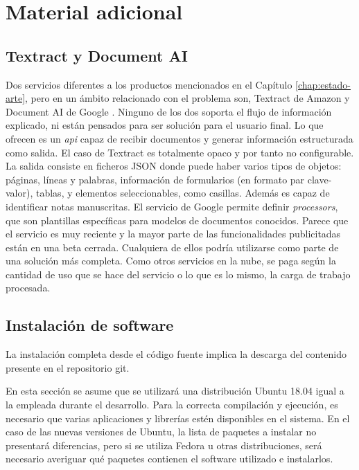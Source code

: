 
\chapter{Material adicional}
\label{chap:material-adicional}

\section{Textract y Document AI}
\label{sec:textract-y-document-ai}

Dos servicios diferentes a los productos mencionados en el Capítulo \ref{chap:estado-arte}, pero en un ámbito relacionado con el problema son, Textract de Amazon \cite{solucionesComerciales_amazon_textract} y Document AI de Google \cite{solucionesComerciales_google_documentAI}. Ninguno de los dos soporta el flujo de información explicado, ni están pensados para ser solución para el usuario final. Lo que ofrecen es un \emph{\acrshort{api}} capaz de recibir documentos y generar información estructurada como salida. El caso de Textract es totalmente opaco y por tanto no configurable. La salida consiste en ficheros JSON donde puede haber varios tipos de objetos: páginas, líneas y palabras, información de formularios (en formato par clave-valor), tablas, y elementos seleccionables, como casillas. Además es capaz de identificar notas manuscritas. El servicio de Google permite definir \emph{processors}, que son plantillas específicas para modelos de documentos conocidos. Parece que el servicio es muy reciente y la mayor parte de las funcionalidades publicitadas están en una beta cerrada. Cualquiera de ellos podría utilizarse como parte de una solución más completa. Como otros servicios en la nube, se paga según la cantidad de uso que se hace del servicio o lo que es lo mismo, la carga de trabajo procesada.

\section{Instalación de software}
\label{sec:instalacion-software}

La instalación completa desde el código fuente implica la descarga del contenido presente en el repositorio git.

En esta sección se asume que se utilizará una distribución Ubuntu 18.04 igual a la empleada durante el desarrollo. Para la correcta compilación y ejecución, es necesario que varias aplicaciones y librerías estén disponibles en el sistema. En el caso de las nuevas versiones de Ubuntu, la lista de paquetes a instalar no presentará diferencias, pero si se utiliza Fedora u otras distribuciones, será necesario averiguar qué paquetes contienen el software utilizado e instalarlos.

